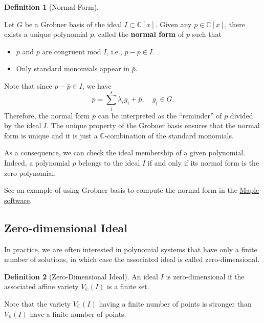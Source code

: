 \documentclass[
]{book}
\theoremstyle{definition}
\newtheorem{definition}{Definition}[chapter]
\theoremstyle{definition}
\theoremstyle{definition}
\theoremstyle{definition}
\theoremstyle{remark}
\begin{document}
\begin{definition}[Normal Form]
\protect\hypertarget{def:NormalForm}{}\label{def:NormalForm}

Let \(G\) be a Grobner basis of the ideal \(I \subset \mathbb{C}[x]\). Given any \(p \in \mathbb{C}[x]\), there exists a unique polynomial \(\bar{p}\), called the \textbf{normal form} of \(p\) such that

\begin{itemize}
\item
  \(p\) and \(\bar{p}\) are congruent mod \(I\), i.e., \(p - \bar{p} \in I\).
\item
  Only standard monomials appear in \(\bar{p}\).
\end{itemize}

\end{definition}

Note that since \(p - \bar{p} \in I\), we have
\[
p = \sum_{i}^s\lambda_i g_i + \bar{p}, \quad g_i \in G.
\]
Therefore, the normal form \(\bar{p}\) can be interpreted as the ``reminder'' of \(p\) divided by the ideal \(I\). The unique property of the Grobner basis ensures that the normal form is unique and it is just a \(\mathbb{C}\)-combination of the standard monomials.

As a consequence, we can check the ideal membership of a given polynomial. Indeed, a polynomial \(p\) belongs to the ideal \(I\) if and only if its normal form is the zero polynomial.

See an example of using Grobner basis to compute the normal form in the \href{https://www.maplesoft.com/support/help/maple/view.aspx?path=Groebner\%2FNormalForm}{Maple software}.

\subsection{Zero-dimensional Ideal}\label{ZeroDimIdeal}

In practice, we are often interested in polynomial systems that have only a finite number of solutions, in which case the associated ideal is called zero-dimensional.

\begin{definition}[Zero-Dimensional Ideal]
\protect\hypertarget{def:ZeroDimensional}{}\label{def:ZeroDimensional}An ideal \(I\) is zero-dimensional if the associated affine variety \(V_{\mathbb{C}}(I)\) is a finite set.
\end{definition}

Note that the variety \(V_{\mathbb{C}}(I)\) having a finite number of points is stronger than \(V_{\mathbb{R}}(I)\) have a finite number of points.
\end{document}
